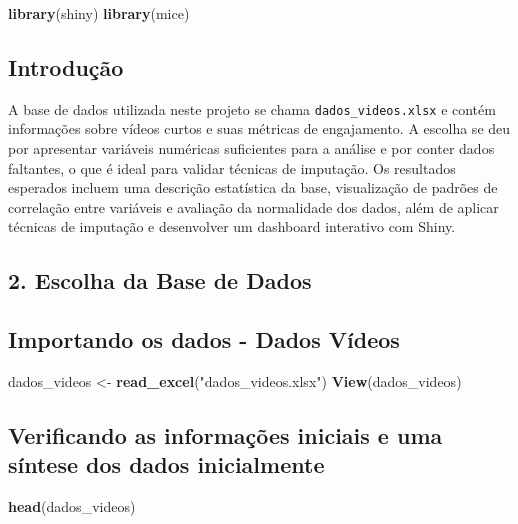 \documentclass[
]{article}
\newenvironment{Shaded}{\begin{snugshade}}{\end{snugshade}}
\newcommand{\FunctionTok}[1]{\textcolor[rgb]{0.13,0.29,0.53}{\textbf{#1}}}
\newcommand{\NormalTok}[1]{#1}
\newcommand{\OtherTok}[1]{\textcolor[rgb]{0.56,0.35,0.01}{#1}}
\newcommand{\StringTok}[1]{\textcolor[rgb]{0.31,0.60,0.02}{#1}}
\begin{document}
\begin{Shaded}
\begin{Highlighting}[]
\FunctionTok{library}\NormalTok{(shiny)}
\FunctionTok{library}\NormalTok{(mice)}
\end{Highlighting}
\end{Shaded}

\subsection{Introdução}\label{introduuxe7uxe3o}

A base de dados utilizada neste projeto se chama
\texttt{dados\_videos.xlsx} e contém informações sobre vídeos curtos e
suas métricas de engajamento. A escolha se deu por apresentar variáveis
numéricas suficientes para a análise e por conter dados faltantes, o que
é ideal para validar técnicas de imputação. Os resultados esperados
incluem uma descrição estatística da base, visualização de padrões de
correlação entre variáveis e avaliação da normalidade dos dados, além de
aplicar técnicas de imputação e desenvolver um dashboard interativo com
Shiny.

\subsection{2. Escolha da Base de Dados}\label{escolha-da-base-de-dados}

\subsection{Importando os dados - Dados
Vídeos}\label{importando-os-dados---dados-vuxeddeos}

\begin{Shaded}
\begin{Highlighting}[]
\NormalTok{dados\_videos }\OtherTok{\textless{}{-}} \FunctionTok{read\_excel}\NormalTok{(}\StringTok{"dados\_videos.xlsx"}\NormalTok{)}
\FunctionTok{View}\NormalTok{(dados\_videos)}
\end{Highlighting}
\end{Shaded}

\subsection{Verificando as informações iniciais e uma síntese dos dados
inicialmente}\label{verificando-as-informauxe7uxf5es-iniciais-e-uma-suxedntese-dos-dados-inicialmente}

\begin{Shaded}
\begin{Highlighting}[]
\FunctionTok{head}\NormalTok{(dados\_videos)}
\end{Highlighting}
\end{Shaded}
\end{document}
